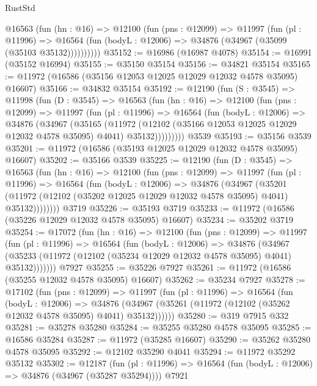 \begin{lexlean}{RustStd}
\begin{coremodule}
        @16563
          (fun (hn : @16) =>
          @12100
            (fun (pns : @12099) =>
            @11997
              (fun (pl : @11996) =>
              @16564 (fun (bodyL : @12006) => @34876 (@34967 (@35099 (@35103 @35132))))))))))
@35152 := @16986 (@16987 @4078)
@35154 := @16991 (@35152 @16994)
@35155 := @35150 @35154
@35156 := @34821 @35154
@35165 := @11972 (@16586 (@35156 @12053 @12025 @12029 @12032 @4578 @35095) @16607)
@35166 := @34832 @35154
@35192 := @12190
    (fun (S : @3545) =>
    @11998
      (fun (D : @3545) =>
      @16563
        (fun (hn : @16) =>
        @12100
          (fun (pns : @12099) =>
          @11997
            (fun (pl : @11996) =>
            @16564
              (fun (bodyL : @12006) =>
              @34876
                (@34967
                  (@35165
                    (@11972
                      (@12102 (@35166 @12053 @12025 @12029 @12032 @4578 @35095) @4041)
                      @35132)))))))))
    @3539
@35193 := @35156 @3539
@35201 := @11972 (@16586 (@35193 @12025 @12029 @12032 @4578 @35095) @16607)
@35202 := @35166 @3539
@35225 := @12190
    (fun (D : @3545) =>
    @16563
      (fun (hn : @16) =>
      @12100
        (fun (pns : @12099) =>
        @11997
          (fun (pl : @11996) =>
          @16564
            (fun (bodyL : @12006) =>
            @34876
              (@34967
                (@35201
                  (@11972 (@12102 (@35202 @12025 @12029 @12032 @4578 @35095) @4041) @35132))))))))
    @3719
@35226 := @35193 @3719
@35233 := @11972 (@16586 (@35226 @12029 @12032 @4578 @35095) @16607)
@35234 := @35202 @3719
@35254 := @17072
    (fun (hn : @16) =>
    @12100
      (fun (pns : @12099) =>
      @11997
        (fun (pl : @11996) =>
        @16564
          (fun (bodyL : @12006) =>
          @34876
            (@34967 (@35233 (@11972 (@12102 (@35234 @12029 @12032 @4578 @35095) @4041) @35132)))))))
    @7927
@35255 := @35226 @7927
@35261 := @11972 (@16586 (@35255 @12032 @4578 @35095) @16607)
@35262 := @35234 @7927
@35278 := @17102
    (fun (pns : @12099) =>
    @11997
      (fun (pl : @11996) =>
      @16564
        (fun (bodyL : @12006) =>
        @34876 (@34967 (@35261 (@11972 (@12102 (@35262 @12032 @4578 @35095) @4041) @35132))))))
@35280 := @319 @7915 @332
@35281 := @35278 @35280
@35284 := @35255 @35280 @4578 @35095
@35285 := @16586 @35284
@35287 := @11972 (@35285 @16607)
@35290 := @35262 @35280 @4578 @35095
@35292 := @12102 @35290 @4041
@35294 := @11972 @35292 @35132
@35302 := @12187
    (fun (pl : @11996) => @16564 (fun (bodyL : @12006) => @34876 (@34967 (@35287 @35294))))
    @7921

\end{coremodule}
\end{lexlean}
